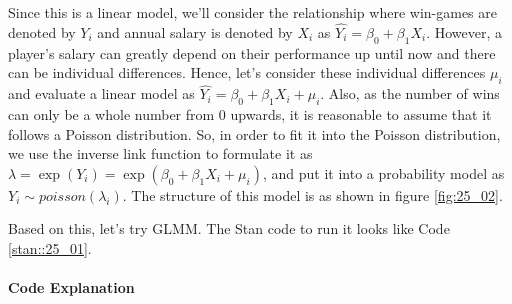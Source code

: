 \documentclass{ltjsbook}
\begin{document}
Since this is a linear model, we'll consider the relationship where win-games are denoted by $Y_i$ and annual salary is denoted by $X_i$ as $\hat{Y_i} = \beta_0 + \beta_1 X_i $. However, a player's salary can greatly depend on their performance up until now and there can be individual differences. Hence, let's consider these individual differences $\mu_i$ and evaluate a linear model as $\hat{Y_i} = \beta_0 + \beta_1 X_i + \mu_i$. Also, as the number of wins can only be a whole number from 0 upwards, it is reasonable to assume that it follows a Poisson distribution. So, in order to fit it into the Poisson distribution, we use the inverse link function to formulate it as $\lambda = \exp(Y_i) = \exp(\beta_0 + \beta_1 X_i + \mu_i)$, and put it into a probability model as $Y_i \sim poisson(\lambda_i)$. The structure of this model is as shown in figure \ref{fig:25_02}.




Based on this, let's try GLMM. The Stan code to run it looks like Code \ref{stan::25_01}.



\paragraph{Code Explanation}

\end{document}
